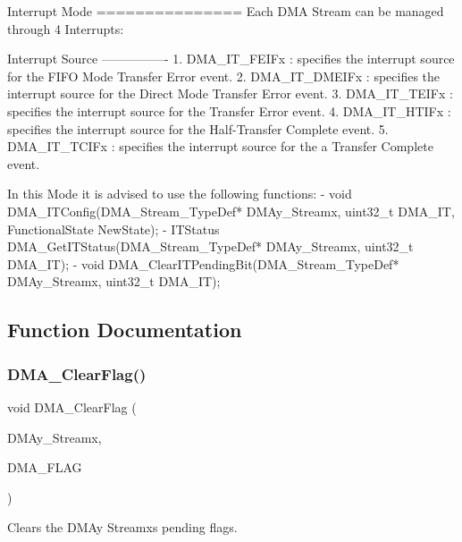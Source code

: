 \begin{DoxyVerb}
  Interrupt Mode
  ===============
    Each DMA Stream can be managed through 4 Interrupts:

    Interrupt Source
    ----------------
       1. DMA_IT_FEIFx  : specifies the interrupt source for the  FIFO Mode Transfer Error event.
       2. DMA_IT_DMEIFx : specifies the interrupt source for the Direct Mode Transfer Error event.
       3. DMA_IT_TEIFx  : specifies the interrupt source for the Transfer Error event.
       4. DMA_IT_HTIFx  : specifies the interrupt source for the Half-Transfer Complete event.
       5. DMA_IT_TCIFx  : specifies the interrupt source for the a Transfer Complete event. 
     
  In this Mode it is advised to use the following functions:
     - void DMA_ITConfig(DMA_Stream_TypeDef* DMAy_Streamx, uint32_t DMA_IT, FunctionalState NewState);
     - ITStatus DMA_GetITStatus(DMA_Stream_TypeDef* DMAy_Streamx, uint32_t DMA_IT);
     - void DMA_ClearITPendingBit(DMA_Stream_TypeDef* DMAy_Streamx, uint32_t DMA_IT);\end{DoxyVerb}
 

\subsection{Function Documentation}
\mbox{\label{group___d_m_a___group4_ga510d62b4051f5a5de164e84b266b851d}} 
\subsubsection{\texorpdfstring{D\+M\+A\+\_\+\+Clear\+Flag()}{DMA\_ClearFlag()}}
{\footnotesize\ttfamily void D\+M\+A\+\_\+\+Clear\+Flag (\begin{DoxyParamCaption}\item[{\hyperlink{struct_d_m_a___stream___type_def}{D\+M\+A\+\_\+\+Stream\+\_\+\+Type\+Def} $\ast$}]{D\+M\+Ay\+\_\+\+Streamx,  }\item[{uint32\+\_\+t}]{D\+M\+A\+\_\+\+F\+L\+AG }\end{DoxyParamCaption})}



Clears the D\+M\+Ay Streamx\textquotesingle{}s pending flags. 


